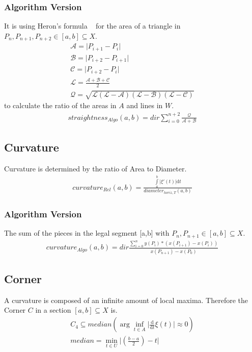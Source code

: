 \documentclass{report}
\begin{document}
\subsubsection{Algorithm Version}
It is using Heron's formula ~\cite{Formelsammlung} for the area of a triangle in $P_{n}, P_{n+1},P_{n+2} \in [a,b] \subseteq X$.
\begin{align*}
\mathcal{A}=\lvert P_{i+1}-P_{i} \rvert\\
\mathcal{B}=\lvert P_{i+2} - P_{i+1} \rvert\\
\mathcal{C}=\lvert P_{i+2} - P_{i} \rvert\\
\mathcal{L}=\frac{\mathcal{A}+\mathcal{B}+\mathcal{C}}{2}\\
\mathcal{Q}=\sqrt{\mathcal{L}(\mathcal{L}-\mathcal{A})(\mathcal{L}-\mathcal{B})(\mathcal{L}-\mathcal{C})}
\end{align*}
to calculate the ratio of the areas in $A$ and lines in $W$.
\begin{align}
straightness_{Algo}(a,b)=dir \sum_{i=0}^{n+2}\frac{\mathcal{Q}}{\mathcal{A}+\mathcal{B}}
\end{align}

\subsection{Curvature}
Curvature is determined by the ratio of Area to Diameter.
\begin{align}
curvature_{Rel}(a,b) = \frac{\int \limits _{a}^{b} \lvert \xi'(t) \rvert \mathrm{d}t}{diameter_{horiz,T}(a,b)}
\end{align}
\subsubsection{Algorithm Version}
The sum of the pieces in the legal segment [a,b] with $P_{n}, P_{n+1} \in [a,b] \subseteq X$.
\begin{align}
curvature_{Algo}(a,b)= dir \frac{\sum \limits _{i=0}^{n}y(P_{i})*(x(P_{i+1})-x(P_{i}))}{x(P_{n+1})-x(P_{0})}
\end{align}

\subsection{Corner}
A curvature is composed of an infinite amount of local maxima. Therefore the Corner $C$ in a section $[a,b] \subseteq X$ is.
\begin{align}
C_{4} \subseteq median(\arg \inf_{t \in A} \lvert \frac{\mathrm{d}}{\mathrm{d}t}\xi(t) \rvert \approx 0) \\
median = \min_{t \in U}\lvert(\frac{b-a}{2})-t\rvert
\end{align}
\end{document}
